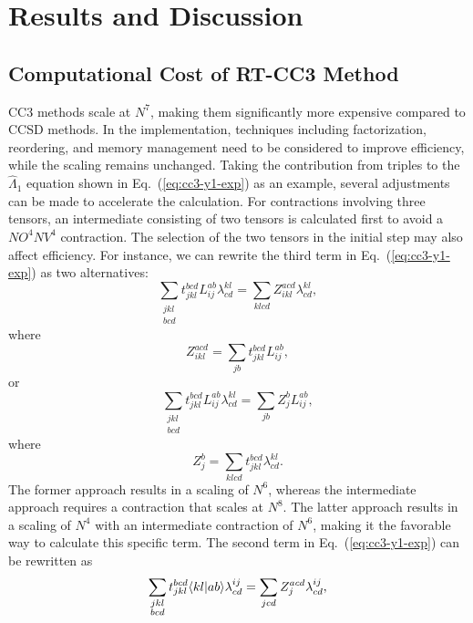 \section{Results and Discussion} \label{results_cc3} 
\subsection{Computational Cost of RT-CC3 Method} \label{results-cc3-1}
CC3 methods scale at $N^{7}$, making them significantly more expensive compared to CCSD methods. In the implementation, techniques including factorization, reordering, and memory management need to be considered to improve efficiency, while the scaling remains unchanged. Taking the contribution from triples to the $\hat{\Lambda}_{1}$ equation shown in Eq.~(\ref{eq:cc3-y1-exp}) as an example, several adjustments can be made to accelerate the calculation. For contractions involving three tensors, an intermediate consisting of two tensors is calculated first to avoid a $NO^{4}NV^{4}$ contraction. The selection of the two tensors in the initial step may also affect efficiency. For instance, we can rewrite the third term in Eq.~(\ref{eq:cc3-y1-exp}) as two alternatives:
\begin{equation}
\sum\limits_{\substack{jkl\\bcd}}t_{jkl}^{bcd}L_{ij}^{ab}\lambda_{cd}^{kl} = \sum_{klcd}Z_{ikl}^{acd}\lambda_{cd}^{kl},
\end{equation}
where
\begin{equation}
Z_{ikl}^{acd}=\sum_{jb}t_{jkl}^{bcd}L_{ij}^{ab},
\end{equation}
or
\begin{equation}
\sum\limits_{\substack{jkl\\bcd}}t_{jkl}^{bcd}L_{ij}^{ab}\lambda_{cd}^{kl} = \sum_{jb}Z_{j}^{b}L_{ij}^{ab},
\end{equation}
where
\begin{equation}
Z_{j}^{b} = \sum_{klcd}t_{jkl}^{bcd}\lambda_{cd}^{kl}.
\end{equation}
The former approach results in a scaling of $N^{6}$, whereas the intermediate approach requires a contraction that scales at $N^{8}$. The latter approach results in a scaling of $N^{4}$ with an intermediate contraction of $N^{6}$, making it the favorable way to calculate this specific term. The second term in Eq.~(\ref{eq:cc3-y1-exp}) can be rewritten as
\begin{equation}
\sum\limits_{\substack{jkl\\bcd}}t_{jkl}^{bcd}\langle kl |ab \rangle \lambda_{cd}^{ij}=\sum_{jcd}Z_{j}^{acd}\lambda_{cd}^{ij},
\label{eq:cc3-result-l1-term211}
\end{equation}
